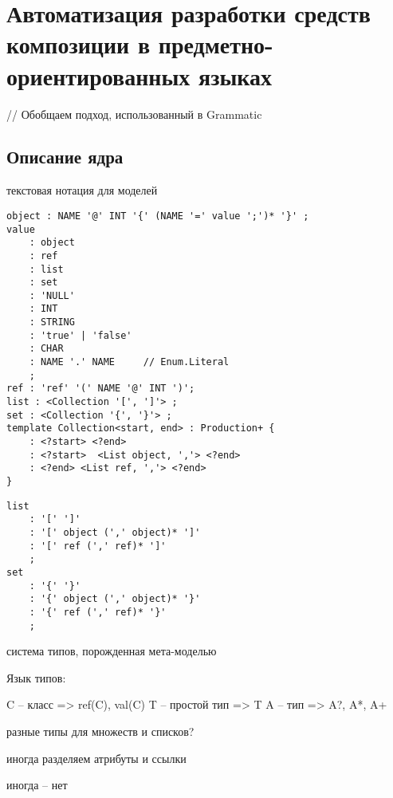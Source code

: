 \part{Автоматизация разработки средств композиции в предметно-ориентированных языках}\label{part4}

// Обобщаем подход, использованный в Grammatic

\chapter{Описание ядра}

текстовая нотация для моделей

\begin{lstlisting}
object : NAME '@' INT '{' (NAME '=' value ';')* '}' ;
value
	: object
	: ref
	: list
	: set
	: 'NULL'
	: INT
	: STRING
	: 'true' | 'false'
	: CHAR
	: NAME '.' NAME     // Enum.Literal
	;
ref	: 'ref' '(' NAME '@' INT ')';
list : <Collection '[', ']'> ;
set : <Collection '{', '}'> ;
template Collection<start, end> : Production+ {
	: <?start> <?end>
	: <?start>  <List object, ','> <?end>
	: <?end> <List ref, ','> <?end>
}
\end{lstlisting}

\begin{lstlisting}
list
	: '[' ']'
	: '[' object (',' object)* ']'
	: '[' ref (',' ref)* ']'
	;
set
	: '{' '}'
	: '{' object (',' object)* '}'
	: '{' ref (',' ref)* '}'
	;
\end{lstlisting}

система типов, порожденная мета-моделью

Язык типов:

C -- класс => ref(C), val(C)
T -- простой тип => T
A -- тип => A?, A*, A+

разные типы для множеств и списков?

иногда разделяем атрибуты и ссылки

\newcommand{\class}[4]{\mathbf{class}\; #1 \langle #2, #3, #4\rangle}
иногда -- нет

